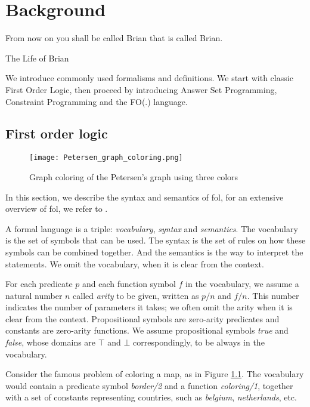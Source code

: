 \chapter{Background} \label{ch:background}
\epigraph{From now on you shall be called Brian that is called Brian.}{The Life of Brian}
We introduce commonly used formalisms and definitions. We start with classic First Order Logic, then proceed by introducing Answer Set Programming, Constraint Programming and the FO(.) language.

\section{First order logic} \label{sec:fol}
\begin{figure}[t]
  \centering
  \texttt{[image: Petersen\_graph\_coloring.png]}
  \caption{Graph coloring of the Petersen's graph using three colors}
  \label{fig:petersen_coloring}
\end{figure}
In this section, we describe the syntax and semantics of \acrshort{fol},
for an extensive overview of \acrshort{fol}, we refer to \textcite{fo_overview}.

A formal language is a triple: \textit{vocabulary}, \textit{syntax} and \textit{semantics}. The vocabulary is the set of symbols that can be used. The syntax is the set of rules on how these symbols can be combined together. And the semantics is the way to interpret the statements. We omit the vocabulary, when it is clear from the context.

For each predicate $p$ and each function symbol $f$ in the vocabulary, we assume a natural number $n$ called \textit{arity} to be given, written as $p/n$ and $f/n$. This number indicates the number of parameters it takes; we often omit the arity when it is clear from the context. Propositional symbols are zero-arity predicates and constants are zero-arity functions. 
We assume propositional symbols \textit{true} and \textit{false}, whose domains are $\top$ and $\bot$ correspondingly, to be always in the vocabulary.

\begin{example}\label{example:predicates_and_functions}
  Consider the famous problem of coloring a map, as in Figure \ref{fig:petersen_coloring}. The vocabulary would contain a predicate symbol \textit{border/2} and a function \textit{coloring/1}, together with a set of constants representing countries, such as \textit{belgium}, \textit{netherlands}, etc.
\end{example}

